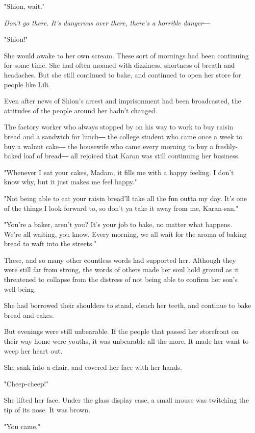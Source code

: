 "Shion, wait."

\emph{Don't go there. It's dangerous over there, there's a horrible danger―}

"Shion!"

She would awake to her own scream. These sort of mornings had been
continuing for some time. She had often moaned with dizziness, shortness
of breath and headaches. But she still continued to bake, and continued
to open her store for people like Lili.

Even after news of Shion's arrest and imprisonment had been broadcasted,
the attitudes of the people around her hadn't changed.

The factory worker who always stopped by on his way to work to buy
raisin bread and a sandwich for lunch― the college student who came once
a week to buy a walnut cake― the housewife who came every morning to buy
a freshly-baked loaf of bread― all rejoiced that Karan was still
continuing her business.

"Whenever I eat your cakes, Madam, it fills me with a happy feeling. I
don't know why, but it just makes me feel happy."

"Not being able to eat your raisin bread'll take all the fun outta my
day. It's one of the things I look forward to, so don't ya take it away
from me, Karan-san."

"You're a baker, aren't you? It's your job to bake, no matter what
happens. We're all waiting, you know. Every morning, we all wait for the
aroma of baking bread to waft into the streets."

These, and so many other countless words had supported her. Although
they were still far from strong, the words of others made her soul hold
ground as it threatened to collapse from the distress of not being able
to confirm her son's well-being.

She had borrowed their shoulders to stand, clench her teeth, and
continue to bake bread and cakes.

But evenings were still unbearable. If the people that passed her
storefront on their way home were youths, it was unbearable all the
more. It made her want to weep her heart out.

She sank into a chair, and covered her face with her hands.

"Cheep-cheep!"

She lifted her face. Under the glass display case, a small mouse was
twitching the tip of its nose. It was brown.

"You came."

